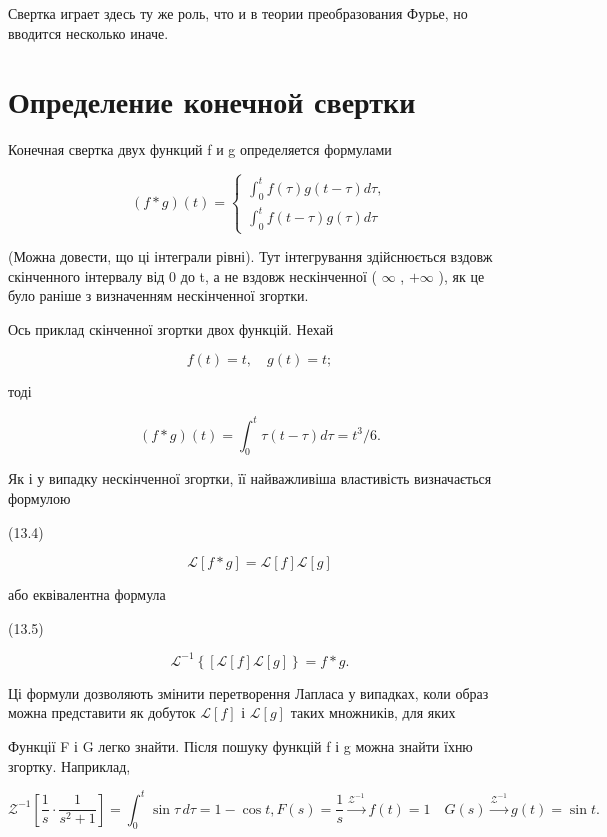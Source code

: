 \documentclass[
  ukrainian,
]{article}
\begin{document}
Свертка играет здесь ту же роль, что и в теории преобразования Фурье, но
вводится несколько иначе.

\section{Определение конечной
свертки}\label{ux43eux43fux440ux435ux434ux435ux43bux435ux43dux438ux435-ux43aux43eux43dux435ux447ux43dux43eux439-ux441ux432ux435ux440ux442ux43aux438}

Конечная свертка двух функций f и g определяется формулами

\[
(f * g) (t) =
\begin{cases} \int_0^t f(\tau) g(t-\tau) d\tau, \\ \int_0^t f(t-\tau) g(\tau) d\tau \end{cases}
\]

(Можна довести, що ці інтеграли рівні). Тут інтегрування здійснюється
вздовж скінченного інтервалу від 0 до t, а не вздовж нескінченної (
\(\infty\) , \(+\infty\) ), як це було раніше з визначенням нескінченної
згортки.

Ось приклад скінченної згортки двох функцій. Нехай

\[
f(t) = t, \quad g(t) = t;
\]

тоді

\[
(f * g)(t) = \int_{0}^{t} \tau(t - \tau) d\tau = t^{3}/6.
\]

Як і у випадку нескінченної згортки, її найважливіша властивість
визначається формулою

(13.4)

\[
\mathscr{L}[f * g] = \mathscr{L}[f] \mathscr{L}[g]
\]

або еквівалентна формула

(13.5)

\[
\mathscr{L}^{-1}\left\{ \left[\mathscr{L}\left[f\right]\mathscr{L}\left[g\right]\right\} = f*g. \right.
\]

Ці формули дозволяють змінити перетворення Лапласа у випадках, коли
образ можна представити як добуток \(\mathscr{L}[f]\) і
\(\mathscr{L}[g]\) таких множників, для яких

Функції F і G легко знайти. Після пошуку функцій f і g можна знайти їхню
згортку. Наприклад,

\[
\mathcal{Z}^{-1}\left[\frac{1}{s} \cdot \frac{1}{s^2+1}\right] = \int_0^t \sin \tau \, d\tau = 1 - \cos t,
F(s) = \frac{1}{s} \xrightarrow{\mathcal{Z}^{-1}} f(t) = 1 \quad G(s) \xrightarrow{\mathcal{Z}^{-1}} g(t) = \sin t.
\]
\end{document}
